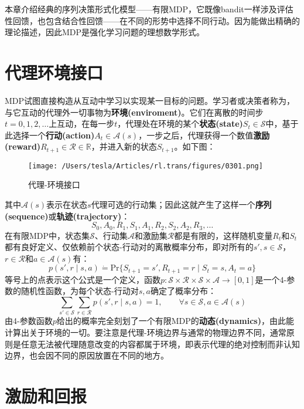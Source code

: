 \documentclass{ctexart}
\begin{document}
本章介绍经典的序列决策形式化模型——有限MDP，它既像bandit一样涉及评估性回馈，也包含结合性回馈——在不同的形势中选择不同行动。因为能做出精确的理论描述，因此MDP是强化学习问题的理想数学形式。

\section{代理环境接口}

MDP试图直接构造从互动中学习以实现某一目标的问题。学习者或决策者称为，与它互动的代理外一切事物为\textbf{环境(enviroment)}。它们在离散的时间步$t=0,1,2,\dots$上互动，在每一步$t$，代理处在环境的某个\textbf{状态(state)}$S_t \in \mathcal S$中，基于此选择一个\textbf{行动(action)}$A_t \in \mathcal A(s)$，一步之后，代理获得一个数值\textbf{激励(reward)}$R_{t+1} \in \mathcal R \in \mathbb R$，并进入新的状态$S_{t+1}$。如下图：
\begin{figure}[htbp]
    \centering
    \texttt{[image: /Users/tesla/Articles/rl.trans/figures/0301.png]}
    \caption{代理-环境接口}
    \label{fig:0301} 
\end{figure}
其中$\mathcal A(s)$表示在状态$s$代理可选的行动集；因此这就产生了这样一个\textbf{序列(sequence)}或\textbf{轨迹(trajectory)}：
\begin{equation}
    S_0,A_0,R_1,S_1,A_1,R_2,S_2,A_2,R_3,\dots
\end{equation}
在有限MDP中，状态集$\mathcal S$、行动集$\mathcal A$和激励集$\mathcal R$都是有限的，这样随机变量$R_t$和$S_t$都有良好定义、仅依赖前个状态-行动对的离散概率分布，即对所有的$s',s \in \mathcal S$，$r \in \mathcal R$和$a \in \mathcal A(s)$有：
\begin{equation}
    p(s',r\mid s,a) \dot= \text{Pr}\{S_{t+1}=s',R_{t+1}=r \mid S_t=s,A_t=a \}
\end{equation}
等号上的点表示这个公式是一个定义，函数$p:\mathcal{S \times R \times S \times A} \to [0,1]$是一个4-参数的随机性函数，为每个状态-行动对$s,a$确定了概率分布：
\begin{equation}
    \sum_{s'\in\mathcal S}\sum_{r\in\mathcal R}p(s',r \mid s,a) = 1, \qquad \forall s\in\mathcal S,a\in\mathcal A(s)
\end{equation}
由4-参数函数$p$给出的概率完全刻划了一个有限MDP的\textbf{动态(dynamics)}，由此能计算出关于环境的一切。要注意是代理-环境边界与通常的物理边界不同，通常原则是任意无法被代理随意改变的内容都属于环境，即表示代理的绝对控制而非认知边界，也会因不同的原因放置在不同的地方。

\section{激励和回报}
\end{document}
